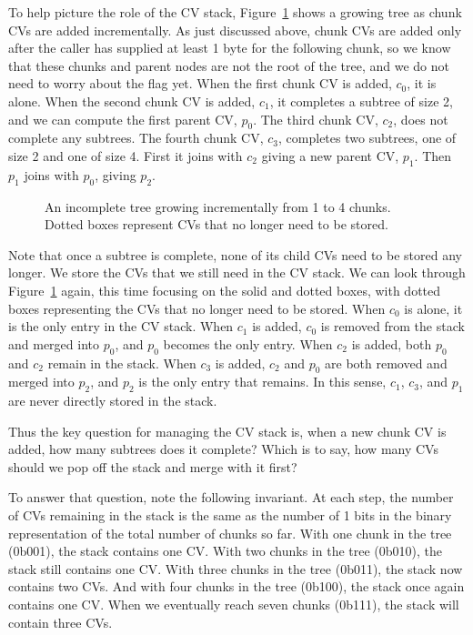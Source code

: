 \documentclass[11pt,notitlepage,a4paper]{article}
\newcommand{\flag}[1]{\texttt{\detokenize{#1}}\xspace}
\begin{document}
To help picture the role of the CV stack, Figure~\ref{fig:incrementaltrees}
shows a growing tree as chunk CVs are added incrementally. As just discussed
above, chunk CVs are added only after the caller has supplied at least 1 byte
for the following chunk, so we know that these chunks and parent nodes are not
the root of the tree, and we do not need to worry about the \flag{ROOT} flag
yet. When the first chunk CV is added, $c_0$, it is alone. When the second
chunk CV is added, $c_1$, it completes a subtree of size 2, and we can compute
the first parent CV, $p_0$. The third chunk CV, $c_2$, does not complete any
subtrees. The fourth chunk CV, $c_3$, completes two subtrees, one of size 2 and
one of size 4. First it joins with $c_2$ giving a new parent CV, $p_1$. Then
$p_1$ joins with $p_0$, giving $p_2$.

\begin{figure}[h]
\centering

\caption{An incomplete tree growing incrementally from 1 to 4 chunks. Dotted
    boxes represent CVs that no longer need to be stored.}
\label{fig:incrementaltrees}
\end{figure}

Note that once a subtree is complete, none of its child CVs need to be stored
any longer. We store the CVs that we still need in the CV stack. We can look
through Figure~\ref{fig:incrementaltrees} again, this time focusing on the
solid and dotted boxes, with dotted boxes representing the CVs that no longer
need to be stored. When $c_0$ is alone, it is the only entry in the CV stack.
When $c_1$ is added, $c_0$ is removed from the stack and merged into $p_0$, and
$p_0$ becomes the only entry. When $c_2$ is added, both $p_0$ and $c_2$ remain
in the stack. When $c_3$ is added, $c_2$ and $p_0$ are both removed and merged
into $p_2$, and $p_2$ is the only entry that remains. In this sense, $c_1$,
$c_3$, and $p_1$ are never directly stored in the stack.

Thus the key question for managing the CV stack is, when a new chunk CV is
added, how many subtrees does it complete? Which is to say, how many CVs should
we pop off the stack and merge with it first?

To answer that question, note the following invariant. At each step, the number
of CVs remaining in the stack is the same as the number of 1 bits in the binary
representation of the total number of chunks so far. With one chunk in the tree
(0b001), the stack contains one CV. With two chunks in the tree (0b010), the
stack still contains one CV. With three chunks in the tree (0b011), the stack
now contains two CVs. And with four chunks in the tree (0b100), the stack once
again contains one CV. When we eventually reach seven chunks (0b111), the stack
will contain three CVs.
\end{document}
